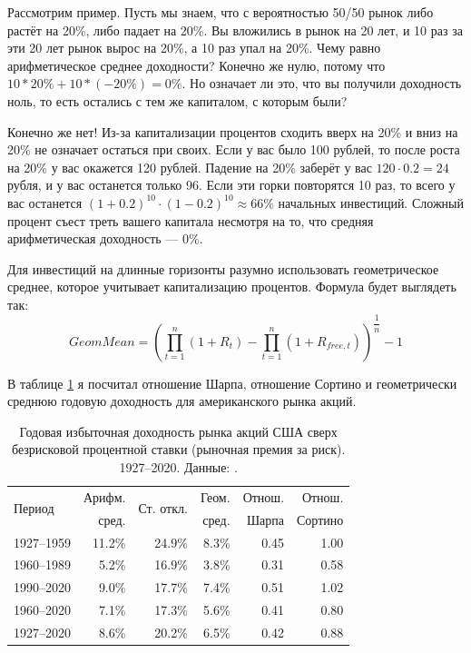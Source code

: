 Рассмотрим пример. Пусть мы знаем, что с вероятностью 50/50 рынок либо растёт на 20\%, либо падает на 20\%. Вы вложились в рынок на 20 лет, и 10 раз за эти 20 лет рынок вырос на 20\%, а 10 раз упал на 20\%. Чему равно арифметическое среднее доходности? Конечно же нулю, потому что $10*20\% + 10*(-20\%) = 0\%$. Но означает ли это, что вы получили доходность ноль, то есть остались с тем же капиталом, с которым были?

Конечно же нет! Из-за капитализации процентов сходить вверх на 20\% и вниз на 20\% не означает остаться при своих. Если у вас было 100 рублей, то после роста на 20\% у вас окажется 120 рублей. Падение на 20\% заберёт у вас $120 \cdot 0.2 = 24$ рубля, и у вас останется только 96. Если эти горки повторятся 10 раз, то всего у вас останется $(1 + 0.2)^{10} \cdot (1 - 0.2)^{10} \approx 66\%$ начальных инвестиций. Сложный процент съест треть вашего капитала несмотря на то, что средняя арифметическая доходность --- 0\%.

Для инвестиций на длинные горизонты разумно использовать геометрическое среднее, которое учитывает капитализацию процентов. Формула будет выглядеть так:
\begin{equation*}
GeomMean = \left(
    \prod\limits_{t=1}^{n}(1 + R_t) -
    \prod\limits_{t=1}^{n}(1 + R_{free,t})
\right) ^ {\dfrac{1}{n}} - 1
\end{equation*}

В таблице  \ref{us_market_sharpe_ratio} я посчитал отношение Шарпа, отношение Сортино и геометрически среднюю годовую доходность для американского рынка акций.

\begin{table}[h]
\centering
\begin{tabular}{l|r|r|r|r|r}
\multirow{2}{*}{Период} &
Арифм. & 
\multirow{2}{*}{Ст. откл.} &
Геом. &
Отнош. &
Отнош. \\
& сред. & & сред. & Шарпа & Сортино \\ 
\hline
1927--1959 & 11.2\% & 24.9\% & 8.3\% & 0.45 & 1.00 \\
1960--1989 &  5.2\% & 16.9\% & 3.8\% & 0.31 & 0.58 \\
1990--2020 &  9.0\% & 17.7\% & 7.4\% & 0.51 & 1.02 \\
1960--2020 &  7.1\% & 17.3\% & 5.6\% & 0.41 & 0.80 \\ \hline
1927--2020 &  8.6\% & 20.2\% & 6.5\% & 0.42 & 0.88 \\
\end{tabular}
\caption{Годовая избыточная доходность рынка акций США сверх безрисковой процентной ставки (рыночная премия за риск). 1927--2020. Данные: \cite{kennethFrench}.}
\label{us_market_sharpe_ratio}
\end{table}

